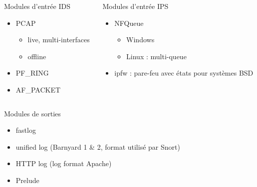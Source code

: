 \documentclass{beamer}
\begin{document}
{\begin{columns}[t]
    \begin{column}{.5\linewidth}
        \begin{block}{Modules d'entrée IDS}
            \begin{itemize}
                \item PCAP
                    \begin{itemize}
                        \item live, multi-interfaces
                        \item offline
                    \end{itemize}
                \item PF\_RING
                \item AF\_PACKET
            \end{itemize}
        \end{block}
    \end{column}
    \begin{column}{.5\linewidth}
        \begin{block}{Modules d'entrée IPS}
            \begin{itemize}
                \item NFQueue
                \begin{itemize}
                        \item Windows
                        \item Linux : multi-queue
                    \end{itemize}
                \item ipfw : pare-feu avec états pour systèmes BSD
            \end{itemize}
        \end{block}
    \end{column}
\end{columns}

\framebreak

\begin{block}{Modules de sorties}
\begin{itemize}
\item fastlog
\item unified log (Barnyard 1 \& 2, format utilisé par Snort)
\item HTTP log (log format Apache)
\item Prelude 
\end{itemize}
\end{block}

}
\end{document}
